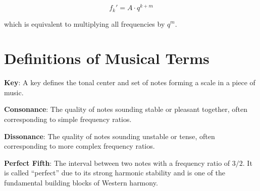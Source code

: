 \documentclass{article}
\begin{document}
\begin{equation}
    f_k' = A \cdot q^{k+m}
\end{equation}

which is equivalent to multiplying all frequencies by $q^m$.

\section{Definitions of Musical Terms}
\textbf{Key}: A key defines the tonal center and set of notes forming a scale in a piece of music.

\textbf{Consonance}: The quality of notes sounding stable or pleasant together, often corresponding to simple frequency ratios.

\textbf{Dissonance}: The quality of notes sounding unstable or tense, often corresponding to more complex frequency ratios.

\textbf{Perfect Fifth}: The interval between two notes with a frequency ratio of $3/2$. It is called ``perfect'' due to its strong harmonic stability and is one of the fundamental building blocks of Western harmony.
\end{document}
